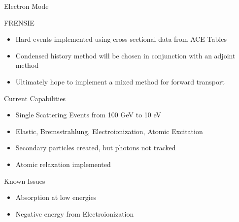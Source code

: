 \documentclass{beamer}
\begin{document}
\begin{frame}{Electron Mode}

  \begin{block}{FRENSIE}
    \begin{itemize}
      \item Hard events implemented using cross-sectional data from ACE Tables
      \item Condensed history method will be chosen in conjunction with an adjoint method
      \item Ultimately hope to implement a mixed method for forward transport
    \end{itemize}    
  \end{block}
  
  \begin{block}{Current Capabilities}
    \begin{itemize}
      \item Single Scattering Events from 100 GeV to 10 eV
      \item Elastic, Bremsstrahlung, Electroionization, Atomic Excitation 
      \item Secondary particles created, but photons not tracked
      \item Atomic relaxation implemented
    \end{itemize}
  \end{block}
    
  \begin{block}{Known Issues}
    \begin{itemize}
      \item Absorption at low energies
      \item Negative energy from Electroionization
    \end{itemize}    
  \end{block}  

\end{frame}
\end{document}

